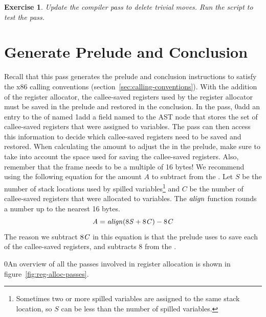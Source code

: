 \documentclass[7x10]{TimesAPriori_MIT}%
\def\racketEd{0}
\def\pythonEd{1}
\def\edition{1}
\newcommand{\racket}[1]{{\if\edition\racketEd{#1}\fi}}
\newcommand{\pythonColor}[0]{}
\newcommand{\python}[1]{{\if\edition\pythonEd\pythonColor #1\fi}}
\newtheorem{exercise}[theorem]{Exercise}
\numberwithin{theorem}{chapter}
\numberwithin{definition}{chapter}
\numberwithin{equation}{chapter}
\begin{document}
\begin{exercise}\normalfont\normalsize
%
Update the  compiler pass to delete trivial moves.
%
%
Run the script to test the  pass.
\end{exercise}


\section{Generate Prelude and Conclusion}
\label{sec:print-x86-reg-alloc}

Recall that this pass generates the prelude and conclusion
instructions to satisfy the x86 calling conventions
(section~\ref{sec:calling-conventions}). With the addition of the
register allocator, the callee-saved registers used by the register
allocator must be saved in the prelude and restored in the conclusion.
In the  pass,
%
\racket{add an entry to the 
  of  named }
%
\python{add a field named \code{used\_callee} to the \code{X86Program} AST node}
%
that stores the set of callee-saved registers that were assigned to
variables. The  pass can then access
this information to decide which callee-saved registers need to be
saved and restored.
%
When calculating the amount to adjust the  in the prelude,
make sure to take into account the space used for saving the
callee-saved registers. Also, remember that the frame needs to be a
multiple of 16 bytes! We recommend using the following equation for
the amount $A$ to subtract from the . Let $S$ be the number
of stack locations used by spilled variables\footnote{Sometimes two or
  more spilled variables are assigned to the same stack location, so
  $S$ can be less than the number of spilled variables.} and $C$ be
the number of callee-saved registers that were
allocated to
variables. The $\mathit{align}$ function rounds a number up to the
nearest 16 bytes.
\[
   \mathit{A} = \mathit{align}(8\mathit{S} + 8\mathit{C}) - 8\mathit{C}
\]
The reason we subtract $8\mathit{C}$ in this equation is that the
prelude uses  to save each of the callee-saved registers,
and  subtracts $8$ from the .

\racket{An overview of all the passes involved in register
  allocation is shown in figure~\ref{fig:reg-alloc-passes}.}
\end{document}
